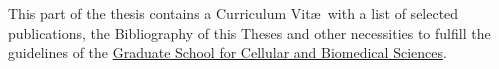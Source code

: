 
\pagestyle{empty}

\hfill

\vfill

This part of the thesis contains a Curriculum Vit\ae\ with a list of selected publications, the Bibliography of this Theses and other necessities to fulfill the guidelines of the \href{http://www.gcb.unibe.ch/content/programme_description/phd_programme/phd_degree/index_eng.html}{Graduate School for Cellular and Biomedical Sciences}.

\vfill



\cleardoublepage